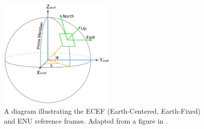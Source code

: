 \begin{figure}[h!]
    \centering
    \includegraphics[width=0.5\textwidth]{images/ECEF_ENU_Longitude_Latitude_relationships.png}
    \caption[ENU and ECEF Reference Frames]{A diagram illustrating the ECEF (Earth-Centered, Earth-Fixed) 
    and ENU reference frames. 
    Adapted from a figure in \cite{ENU}.}
    \label{fig:ENU}
\end{figure}

